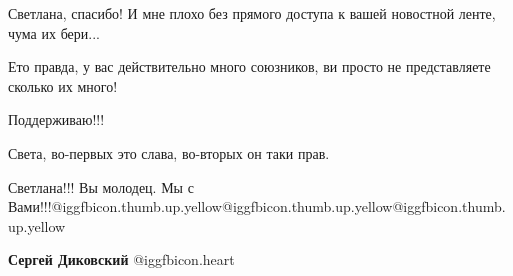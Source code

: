 \begin{itemize}
Светлана, спасибо! И мне плохо без прямого доступа к вашей новостной ленте, чума их бери...

 
Ето правда, у вас действительно много союзников, ви просто не представляете сколько их много!

 
Поддерживаю!!!

 
Света, во-первых это слава, во-вторых он таки прав.

 
Светлана!!! Вы молодец.
Мы с Вами!!!@igg{fbicon.thumb.up.yellow}@igg{fbicon.thumb.up.yellow}@igg{fbicon.thumb.up.yellow}


\begin{itemize}
 
\textbf{Сергей Диковский} @igg{fbicon.heart}
\end{itemize}

 

\end{itemize}
